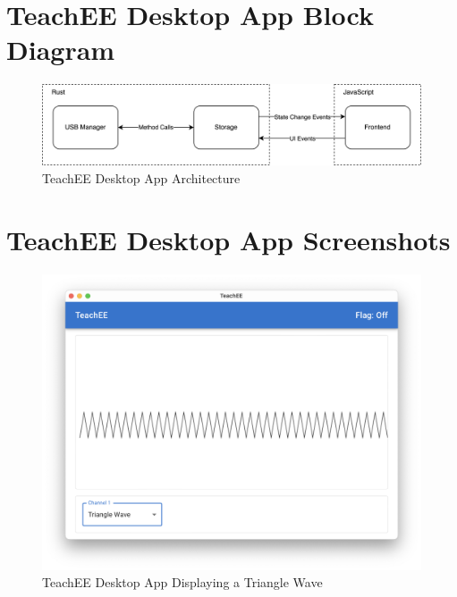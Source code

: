 \documentclass[letterpaper,12pt]{article}
\begin{document}
\begin{appendices}
        \section{TeachEE Desktop App Block Diagram}
        \label{appendix:architecture}
    \begin{figure}[H]
        \centering
        \includegraphics[width=\textwidth]{schematics/sw-architecture.png}
        \caption{TeachEE Desktop App Architecture}
    \end{figure}

        \section{TeachEE Desktop App Screenshots}
        \label{appendix:screenshot}
    \begin{figure}[H]
        \centering
        \includegraphics[width=\textwidth]{./schematics/sw-screenshot.png}
        \caption{TeachEE Desktop App Displaying a Triangle Wave}
    \end{figure}
        
    \end{appendices}
\end{document}
